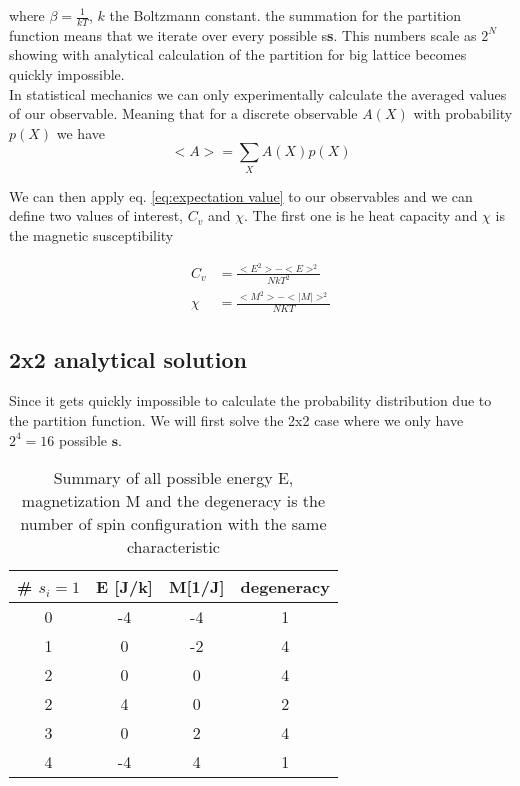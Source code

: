 \documentclass[english,notitlepage,reprint,nofootinbib]{revtex4-2}  %
\begin{document}
	where $\beta = \frac{1}{kT}$, $k$ the Boltzmann constant. the summation for the partition
	function means that we iterate over every possible s\textbf{s}. This numbers scale as $2^N$
	showing with analytical calculation of the partition for big lattice becomes quickly 
	impossible. \\
	
	In statistical mechanics we can only experimentally calculate the averaged values of our 
	observable. Meaning that for a discrete observable $A(X)$ with probability $p(X)$ we have 
	\begin{equation}
		<A> = \sum_{X}A(X)p(X) \label{eq:expectation value}
	\end{equation} 
	
	We can then apply eq. \ref{eq:expectation value} to our observables and we can define two 
	values of interest, $C_v$ and $\chi$. The first one is he heat capacity and $\chi$ is the
	magnetic susceptibility 
	
	\begin{align}
		C_v &= \frac{<E^2> - <E>^2}{NkT^2} \label{eq:heat_capacity} \\
		\chi &= \frac{<M^2> - <|M|>^2}{NKT} \label{eq:susceptibility}
	\end{align}
 	
	\subsection{2x2 analytical solution}
	
	Since it gets quickly impossible to calculate the probability distribution due to the 
	partition function. We will first solve the 2x2 case where we only have $2^4=16$ possible
	$\textbf{s}$. 
	
	\begin{table}[h!]
	\centering
	\begin{tabular}{|c|c|c|c|}
		\hline
		\# $s_i=1$ & E [J/k] & M[1/J] & degeneracy \\
		\hline
		\hline
		0 & -4 &  -4 &  1  \\
		1 & 0&   -2&   4  \\ 
		2 & 0 & 0&  4  \\
		2 & 4 & 0 &  2 \\
		3 & 0  & 2 & 4 \\
		4 & -4 & 4 & 1 \\
		\hline
	\end{tabular}
	\caption{ Summary of all possible energy E, magnetization M and the degeneracy is the 
	number of spin configuration with the same characteristic} \label{tab:summary2x2}
	\end{table} 
	
\end{document}
